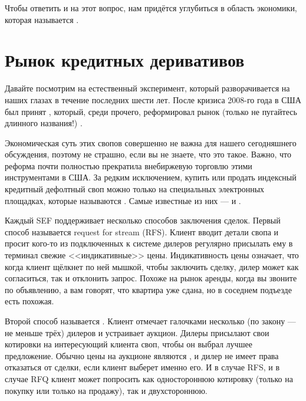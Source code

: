 Чтобы ответить и на этот вопрос, нам придётся углубиться в область экономики,
которая называется .

\section*{Рынок кредитных деривативов}

Давайте посмотрим на естественный эксперимент, который разворачивается на наших
глазах в течение последних шести лет. После кризиса 2008-го года в США был
принят , который, среди прочего,
реформировал рынок (только не пугайтесь длинного названия!)  \cite{collin2018}.

Экономическая суть этих свопов совершенно не важна для нашего сегодняшнего
обсуждения, поэтому не страшно, если вы не знаете, что это такое. Важно, что
реформа почти полностью прекратила внебиржевую торговлю этими инструментами в
США. За редким исключением, купить или продать индексный кредитный дефолтный
своп можно только на специальных электронных площадках, которые называются
. Самые известные из них ---
и
.

Каждый SEF поддерживает несколько способов заключения сделок. Первый способ
называется request for stream (RFS). Клиент вводит детали свопа и просит кого-то
из подключенных к системе дилеров регулярно присылать ему в терминал свежие
<<индикативные>> цены. Индикативность цены означает, что когда клиент щёлкнет по
ней мышкой, чтобы заключить сделку, дилер может как согласиться, так и отклонить
запрос. Похоже на рынок аренды, когда вы звоните по объявлению, а вам говорят,
что квартира уже сдана, но в соседнем подъезде есть похожая.

Второй способ называется . Клиент отмечает галочками
несколько (по закону --- не меньше трёх) дилеров и устраивает аукцион. Дилеры
присылают свои котировки на интересующий клиента своп, чтобы он выбрал лучшее
предложение. Обычно цены на аукционе являются , и дилер
не имеет права отказаться от сделки, если клиент выберет именно его. И в случае
RFS, и в случае RFQ клиент может попросить как одностороннюю котировку (только
на покупку или только на продажу), так и двухстороннюю.

